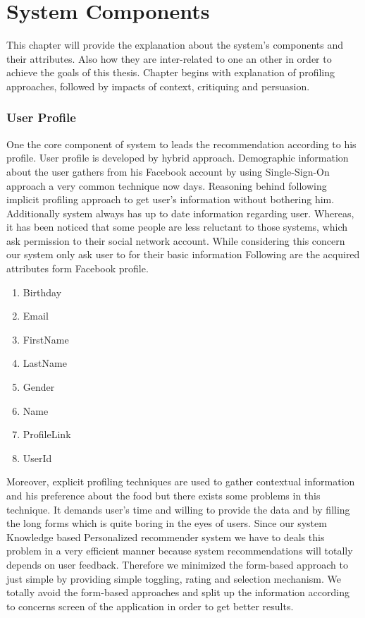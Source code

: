 
\chapter{System Components}

This chapter will provide the explanation about the system’s components and their attributes. Also how they are inter-related to one an other in order to achieve the goals of this thesis. Chapter begins with explanation of profiling approaches, followed by impacts of context, critiquing and persuasion.

\subsection{User Profile}

One the core component of system to leads the recommendation according to his profile. User profile is developed by hybrid approach. Demographic information about the user gathers from his Facebook account by using Single-Sign-On approach a very common technique now days. Reasoning behind following implicit profiling approach to get user’s information without bothering him. Additionally system always has up to date information regarding user. Whereas, it has been noticed that some people are less reluctant to those systems, which ask permission to their social network account. While considering this concern our system only ask user to for their basic information Following are the acquired attributes form Facebook profile.

\begin{enumerate}
	\item Birthday
	\item Email	
	\item FirstName
	\item LastName
	\item Gender
	\item Name
	\item ProfileLink
	\item UserId
\end{enumerate}

Moreover, explicit profiling techniques are used to gather contextual information and his preference about the food but there exists some problems in this technique. It demands user’s time and willing to provide the data and by filling the long forms which is quite boring in the eyes of users. Since our system Knowledge based Personalized recommender system we have to deals this problem in a very efficient manner because system recommendations will totally depends on user feedback. Therefore we minimized the form-based approach to just simple by providing simple toggling, rating and selection mechanism. We totally avoid the form-based approaches and split up the information according to concerns screen of the application in order to get better results.


